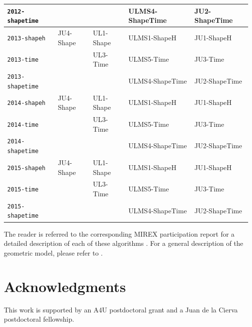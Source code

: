\documentclass[twoside]{article}
\begin{document}
\begin{table}[!h]
\begin{tabular}{l|llll}
	\texttt{2012-shapetime}  &                         &                    & \textsf{ULMS4-ShapeTime} & \textsf{JU2-ShapeTime} \\ \hline
	\texttt{2013-shapeh}     & \textsf{JU4-Shape}      & \textsf{UL1-Shape} & \textsf{ULMS1-ShapeH}    & \textsf{JU1-ShapeH}    \\
	\texttt{2013-time}       &                         & \textsf{UL3-Time}  & \textsf{ULMS5-Time}      & \textsf{JU3-Time}      \\
	\texttt{2013-shapetime}  &                         &                    & \textsf{ULMS4-ShapeTime} & \textsf{JU2-ShapeTime} \\ \hline
	\texttt{2014-shapeh}     & \textsf{JU4-Shape}      & \textsf{UL1-Shape} & \textsf{ULMS1-ShapeH}    & \textsf{JU1-ShapeH}    \\
	\texttt{2014-time}       &                         & \textsf{UL3-Time}  & \textsf{ULMS5-Time}      & \textsf{JU3-Time}      \\
	\texttt{2014-shapetime}  &                         &                    & \textsf{ULMS4-ShapeTime} & \textsf{JU2-ShapeTime} \\ \hline
	\texttt{2015-shapeh}     & \textsf{JU4-Shape}      & \textsf{UL1-Shape} & \textsf{ULMS1-ShapeH}    & \textsf{JU1-ShapeH}    \\
	\texttt{2015-time}       &                         & \textsf{UL3-Time}  & \textsf{ULMS5-Time}      & \textsf{JU3-Time}      \\
	\texttt{2015-shapetime}  &                         &                    & \textsf{ULMS4-ShapeTime} & \textsf{JU2-ShapeTime} \\ \hline
\end{tabular}
\end{table}

The reader is referred to the corresponding MIREX participation report for a detailed description of each of these algorithms \cite{Urbano2010:mirex2010,Urbano2011:mirex2011,Urbano2012:mirex2012,Urbano2013:mirex2013,Urbano2014:mirex2014,Urbano2015:mirex2015}. For a general description of the geometric model, please refer to \cite{Urbano2011:shape}.

\section*{Acknowledgments}
This work is supported by an A4U postdoctoral grant and a Juan de la Cierva postdoctoral fellowship.



\end{document}
